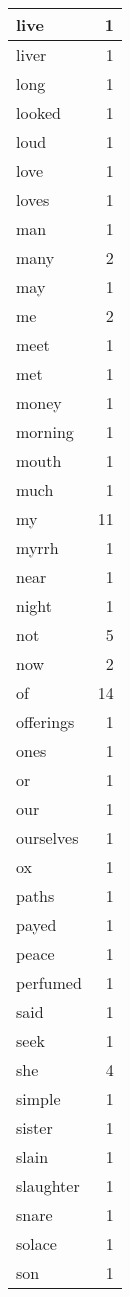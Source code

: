 \begin{center}
\begin{longtable}{l|r}
live & 1\\ \hline 
liver & 1\\ \hline 
long & 1\\ \hline 
looked & 1\\ \hline 
loud & 1\\ \hline 
love & 1\\ \hline 
loves & 1\\ \hline 
man & 1\\ \hline 
many & 2\\ \hline 
may & 1\\ \hline 
me & 2\\ \hline 
meet & 1\\ \hline 
met & 1\\ \hline 
money & 1\\ \hline 
morning & 1\\ \hline 
mouth & 1\\ \hline 
much & 1\\ \hline 
my & 11\\ \hline 
myrrh & 1\\ \hline 
near & 1\\ \hline 
night & 1\\ \hline 
not & 5\\ \hline 
now & 2\\ \hline 
of & 14\\ \hline 
offerings & 1\\ \hline 
ones & 1\\ \hline 
or & 1\\ \hline 
our & 1\\ \hline 
ourselves & 1\\ \hline 
ox & 1\\ \hline 
paths & 1\\ \hline 
payed & 1\\ \hline 
peace & 1\\ \hline 
perfumed & 1\\ \hline 
said & 1\\ \hline 
seek & 1\\ \hline 
she & 4\\ \hline 
simple & 1\\ \hline 
sister & 1\\ \hline 
slain & 1\\ \hline 
slaughter & 1\\ \hline 
snare & 1\\ \hline 
solace & 1\\ \hline 
son & 1\\ \hline 

\end{longtable}
\end{center}

